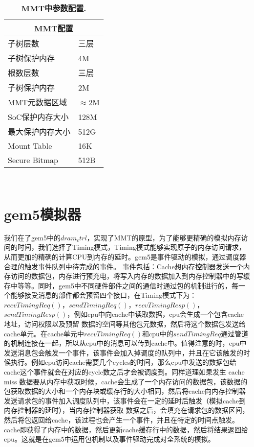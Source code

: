 \begin{table}[htp]
    \centering
    \footnotesize
    \caption{\textbf{MMT中参数配置.}}
    \label{t:gem5-config}
    \begin{tabular}{p{3.25cm}<{\centering} p{3.25cm}<{\centering} }
    \toprule
    \multicolumn{2}{c}{\textbf{MMT配置}} \\ \hline
    子树层数              & 三层   \\
    子树保护内存              & 4M   \\
    根数层数              & 三层   \\
    子树保护内存              & 2M   \\
    MMT元数据区域              & $\approx$2M   \\
    SoC保护内存大小              & 128M   \\
    最大保护内存大小              &  512G   \\
    Mount Table              & 16K   \\
    Secure Bitmap   & 512B \\
    \bottomrule
    \end{tabular} \\[-5pt]
\end{table}

\section{gem5模拟器}
我们在了gem5中的$dram_ctrl$，实现了MMT的原型，为了能够更精确的模拟内存访问的时间，我们选择了Timing模式，Timing模式能够实现原子的内存访问请求，从而更加的精确的计算CPU到内存的延时。gem5是事件驱动的模拟，通过调度器合理的触发事件队列中待完成的事件。
事件包括：Cache想内存控制器发送一个内存访问的数据包，内存进行预充电，将写入内存的数据加入到内存控制器中的写缓存中等等。同时，gem5中不同硬件部件之间的通信时通过包的机制进行的，每一个能够接受消息的部件都会预留四个接口，在Timing模式下为：$recvTimingReq()$，$sendTimingReq()$，$recvTimingResp()$，$sendTimingResp()$，例如cpu中向cache中读取数据，cpu会生成一个包含cache地址，访问权限以及预留
数据的空间等其他包元数据，然后将这个数据包发送给cache单元。在cache单元中$recvTimingReq()$和cpu中的$sendTimingReq$通过管道的机制连接在一起，所以从cpu中的消息可以传到cache中。值得注意的时，cpu中发送消息包会触发一个事件，该事件会加入掉调度的队列中，并且在它该触发的时候执行。例如cpu访问cache需要几个cycles的时间，那么cpu中发送的数据包给cache这个事件就会在对应的cycle数之后才会被调度到。同样道理如果发生
cache miss 数据要从内存中获取时候，cache会生成了一个内存访问的数据包，该数据的包获取数据的大小和一个内存块或缓存行的大小相同，然后将cache向内存控制器发送请求包的事件加入调度队列中，该事件会在一定的延时后触发（模拟cache到内存控制器的延时），当内存控制器获取
数据之后，会填充在请求包的数据区间，然后将包返回给cache，该过程也会产生一个事件，并且在特定的时间点触发。cache即获得了内存中的数据，然后更新cache缓存行中的数据，然后将结果返回给cpu。这就是在gem5中运用包机制以及事件驱动完成对全系统的模拟。


